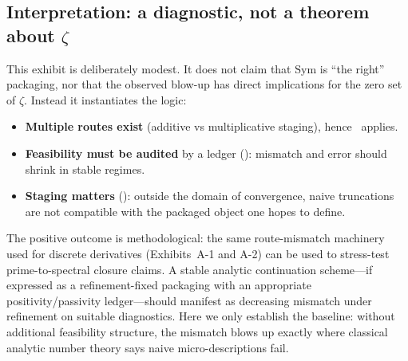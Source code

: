 \subsection{Interpretation: a diagnostic, not a theorem about \texorpdfstring{$\zeta$}{zeta}}
This exhibit is deliberately modest.
It does not claim that $\mathrm{Sym}$ is ``the right'' packaging, nor that the observed blow-up has direct implications for the zero set of $\zeta$.
Instead it instantiates the \SBT logic:

\begin{itemize}
  \item \textbf{Multiple routes exist} (additive vs multiplicative staging), hence \Pthree\ applies.
  \item \textbf{Feasibility must be audited} by a ledger (\Psix): mismatch and error should shrink in stable regimes.
  \item \textbf{Staging matters} (\Pfour): outside the domain of convergence, naive truncations are not compatible with the packaged object one hopes to define.
\end{itemize}

The positive outcome is methodological: the same route-mismatch machinery used for discrete derivatives (Exhibits~A-1 and A-2) can be used to stress-test prime-to-spectral closure claims.
A stable analytic continuation scheme---if expressed as a refinement-fixed packaging with an appropriate positivity/passivity ledger---should manifest as decreasing mismatch under refinement on suitable diagnostics.
Here we only establish the baseline: without additional feasibility structure, the mismatch blows up exactly where classical analytic number theory says naive micro-descriptions fail.
